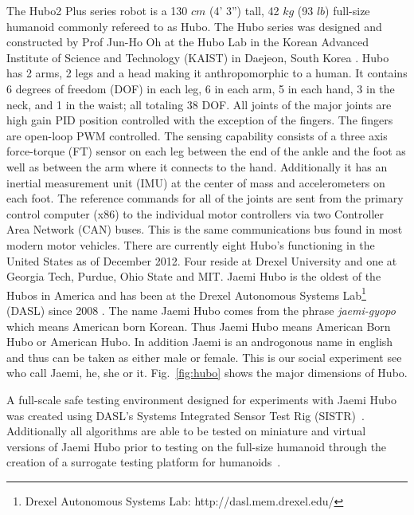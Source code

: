 The Hubo2 Plus series robot is a 130 $cm$ (4' 3'') tall, 42 $kg$ (93 $lb$) full-size humanoid commonly refereed to as Hubo.  
The Hubo series was designed and constructed by Prof Jun-Ho Oh at the Hubo Lab in the Korean Advanced Institute of Science and Technology (KAIST) in Daejeon, South Korea \cite{hubofirst}.
Hubo has 2 arms, 2 legs and a head making it anthropomorphic to a human.
It contains 6 degrees of freedom (DOF) in each leg, 6 in each arm, 5 in each hand, 3 in the neck, and 1 in the waist; all totaling 38 DOF.
All joints of the major joints are high gain PID position controlled with the exception of the fingers.
The fingers are open-loop PWM controlled.
The sensing capability consists of a three axis force-torque (FT) sensor on each leg between the end of the ankle and the foot as well as between the arm where it connects to the hand.
Additionally it has an inertial measurement unit (IMU) at the center of mass and accelerometers on each foot.
The reference commands for all of the joints are sent from the primary control computer (x86) to the individual motor controllers via two Controller Area Network (CAN) buses.
This is the same communications bus found in most modern motor vehicles.
There are currently eight Hubo's functioning in the United States as of December 2012.
Four reside at Drexel University and one at Georgia Tech, Purdue, Ohio State and MIT.
Jaemi Hubo is the oldest of the Hubos in America and has been at the Drexel Autonomous Systems Lab\footnote{Drexel Autonomous Systems Lab: http://dasl.mem.drexel.edu/} (DASL) since 2008 \cite{jaemiHuboSRM}.
The name Jaemi Hubo comes from the phrase \textit{jaemi-gyopo} which means American born Korean.
Thus Jaemi Hubo means American Born Hubo or American Hubo.  
In addition Jaemi is an androgonous name in english and thus can be taken as either male or female. 
This is our social experiment see who call Jaemi, he, she or it.
Fig.~\ref{fig:hubo} shows the major dimensions of Hubo.

A full-scale safe testing environment designed for experiments with Jaemi Hubo was created using DASL's Systems Integrated Sensor Test Rig (SISTR)~\cite{5686325}.  
Additionally all algorithms are able to be tested on miniature and virtual versions of Jaemi Hubo prior to testing on the full-size humanoid through the creation of a surrogate testing platform for humanoids~\cite{5379582}.

